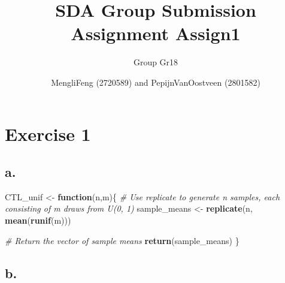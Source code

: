 \documentclass[
]{article}
\title{SDA Group Submission Assignment Assign1}
\subtitle{Group Gr18}
\author{MengliFeng (2720589) and PepijnVanOostveen (2801582)}
\date{}
\newenvironment{Shaded}{\begin{snugshade}}{\end{snugshade}}
\newcommand{\CommentTok}[1]{\textcolor[rgb]{0.56,0.35,0.01}{\textit{#1}}}
\newcommand{\ControlFlowTok}[1]{\textcolor[rgb]{0.13,0.29,0.53}{\textbf{#1}}}
\newcommand{\FunctionTok}[1]{\textcolor[rgb]{0.13,0.29,0.53}{\textbf{#1}}}
\newcommand{\NormalTok}[1]{#1}
\newcommand{\OtherTok}[1]{\textcolor[rgb]{0.56,0.35,0.01}{#1}}
\begin{document}
\maketitle

\section{Exercise 1}\label{exercise-1}

\subsection{a.}\label{a.}

\begin{Shaded}
\begin{Highlighting}[]
\NormalTok{CTL\_unif }\OtherTok{\textless{}{-}} \ControlFlowTok{function}\NormalTok{(n,m)\{}
  \CommentTok{\# Use replicate to generate n samples, each consisting of m draws from U(0, 1)}
\NormalTok{  sample\_means }\OtherTok{\textless{}{-}} \FunctionTok{replicate}\NormalTok{(n, }\FunctionTok{mean}\NormalTok{(}\FunctionTok{runif}\NormalTok{(m)))}
  
  \CommentTok{\# Return the vector of sample means}
  \FunctionTok{return}\NormalTok{(sample\_means)}
\NormalTok{\}}
\end{Highlighting}
\end{Shaded}

\subsection{b.}\label{b.}
\end{document}

